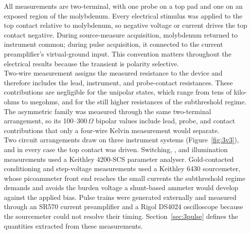 \noindent All measurements are two-terminal, with one probe on a top pad and one on an exposed region of the
molybdenum. Every electrical stimulus was applied to the top contact relative to molybdenum, so negative voltage or
current drives the top contact negative. During source-measure acquisition, molybdenum returned to instrument
common; during pulse acquisition, it connected to the current preamplifier's virtual-ground input. This convention
matters throughout the electrical results because the transient is polarity selective.\\

\noindent Two-wire measurement assigns the measured resistance to the device and therefore includes the lead,
instrument, and probe-contact resistances. These contributions are negligible for the unipolar states, which range
from tens of kilo-ohms to megohms, and for the still higher resistances of the subthreshold regime. The asymmetric
family was measured through the same two-terminal arrangement, so its 100--300\,$\Omega$ bipolar values include
lead, probe, and contact contributions that only a four-wire Kelvin measurement would separate.\\

\noindent Two circuit arrangements draw on three instrument systems (Figure~\ref{fig:3v3}), and in every case the
top contact was driven. Switching, , and illumination measurements used a Keithley 4200-SCS parameter
analyser. Gold-contacted conditioning and step-voltage measurements used a Keithley 6430 sourcemeter, whose
picoammeter front end reaches the small currents the subthreshold regime demands and avoids the burden voltage a
shunt-based ammeter would develop against the applied bias. Pulse trains were generated externally and measured
through an SR570 current preamplifier and a Rigol DS4024 oscilloscope because the sourcemeter could not resolve their
timing. Section~\ref{sec:3pulse} defines the quantities extracted from these measurements.\\

